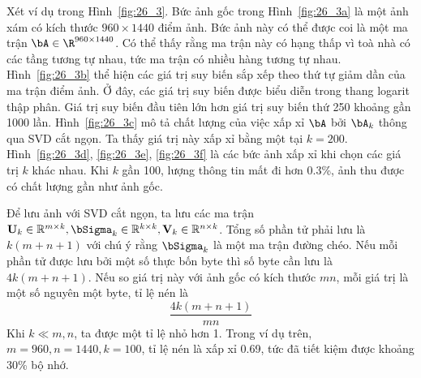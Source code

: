 Xét ví dụ trong Hình~\ref{fig:26_3}. Bức ảnh gốc trong Hình~\ref{fig:26_3a} là
một ảnh xám có
kích thước
$960\times 1440$ điểm ảnh. Bức ảnh này có thể được coi là một ma trận $\bA \in
\R^{960\times 1440}$. Có thể thấy rằng ma trận này có hạng thấp vì toà nhà có các tầng tương tự nhau, tức ma trận có nhiều hàng tương tự nhau.
Hình~\ref{fig:26_3b} thể hiện các giá trị suy biến sắp xếp theo thứ tự giảm dần
của ma trận điểm ảnh. Ở đây, các giá trị suy biến được biểu diễn trong thang logarit thập phân. Giá trị suy biến đầu tiên lớn hơn giá trị suy biến thứ 250 khoảng gần 1000 lần. Hình~\ref{fig:26_3c} mô tả chất lượng của việc xấp xỉ $\bA$ bởi
$\bA_k$ thông qua SVD cắt ngọn. Ta thấy giá trị này xấp xỉ bằng một tại $k =
200$. Hình~\ref{fig:26_3d}, \ref{fig:26_3e}, \ref{fig:26_3f} là các bức ảnh xấp
xỉ khi chọn các giá trị $k$ khác nhau. Khi $k$ gần 100, lượng thông tin mất đi hơn 0.3\%, ảnh thu được có chất lượng gần như ảnh gốc.


Để lưu ảnh với SVD cắt ngọn, ta lưu các ma trận $\mathbf{U}_k \in
\mathbb{R}^{m \times k}, \bSigma_k \in \mathbb{R}^{k \times k}, \mathbf{V}_k \in
\mathbb{R}^{n \times k}$. Tổng số phần tử phải lưu là $k(m + n + 1)$ với chú ý
rằng $\bSigma_k$ là một ma trận đường chéo. Nếu mỗi phần
tử được lưu bởi một số thực bốn byte thì số byte cần lưu là $4k(m + n + 1)$. Nếu so giá trị này với ảnh gốc có kích thước $mn$, mỗi giá trị là một số
nguyên một byte, tỉ lệ nén là
\begin{equation} 
\frac{4k(m + n + 1)}{mn} 
\end{equation} 
Khi $k \ll m, n$, ta được một tỉ lệ nhỏ hơn 1. Trong ví dụ trên, $m =
960, n = 1440, k = 100$, tỉ lệ nén là xấp xỉ 0.69, tức đã tiết kiệm được
khoảng 30\% bộ nhớ.
 
 
 
 
     
